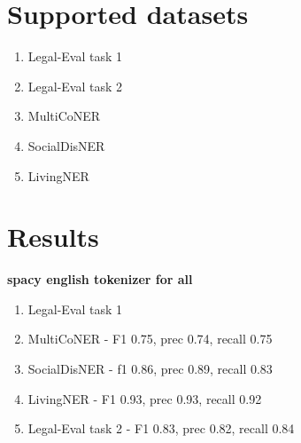 \documentclass{article}
\begin{document}
\section{Supported datasets}
\begin{enumerate}
  \item Legal-Eval task 1
  \item Legal-Eval task 2
  \item MultiCoNER 
  \item SocialDisNER
  \item LivingNER
\end{enumerate}
\section{Results}
\textbf{spacy english tokenizer for all}
\begin{enumerate}
  \item Legal-Eval task 1
  \item MultiCoNER - F1 0.75, prec 0.74, recall 0.75
  \item SocialDisNER - f1 0.86, prec 0.89, recall 0.83
  \item LivingNER - F1 0.93, prec 0.93, recall 0.92
  \item Legal-Eval task 2 - F1 0.83, prec 0.82, recall 0.84
\end{enumerate}
\end{document}
